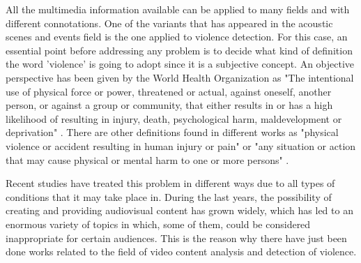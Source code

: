 	All the multimedia information available can be applied to many fields and with different connotations. One of the variants that has appeared in the acoustic scenes and events field is the one applied to violence detection. For this case, an essential point before addressing any problem is to decide what kind of definition the word 'violence' is going to adopt since it is a subjective concept. An objective perspective has been given by the World Health Organization as "The  intentional  use  of physical  force  or  power,  threatened  or  actual,  against oneself, another person, or against a group or community, that either results in or has a high likelihood of resulting in injury,  death,  psychological  harm,  maldevelopment  or deprivation" \cite{Krug2002}. There are other definitions found in different works as "physical violence or accident resulting in human injury or pain" \cite{Demarty2013} or "any situation or action that may cause physical or mental harm to one or more persons" \cite{Giannakopoulos2006}.
	
	Recent studies have treated this problem in different ways due to all types of conditions that it may take place in. During the last years, the possibility of creating and providing audiovisual content has grown widely, which has led to an enormous variety of topics in which, some of them, could be considered inappropriate for certain  audiences. This is the reason why there have just been done works related to the field of video content analysis and detection of violence. 
	
